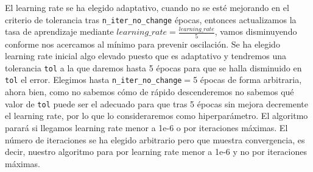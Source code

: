 \documentclass[11pt,a4paper]{article}
\theoremstyle{definition}
\begin{document}
	 El learning rate se ha elegido adaptativo, cuando no se esté mejorando en el criterio de tolerancia tras \texttt{n\_iter\_no\_change} épocas, entonces actualizamos la tasa de aprendizaje mediante $learning\_rate =\frac{learning\_rate}{5}$, vamos disminuyendo conforme nos acercamos al mínimo para prevenir oscilación. Se ha elegido learning rate inicial algo elevado puesto que es adaptativo y  tendremos una tolerancia \texttt{tol} a la que daremos hasta 5 épocas para que se halla disminuido en \texttt{tol} el error. Elegimos hasta \texttt{n\_iter\_no\_change}$=$5 épocas de forma arbitraria, ahora bien, como no sabemos cómo de rápido descenderemos no sabemos qué valor de \texttt{tol} puede ser el adecuado para que tras 5 épocas sin mejora decremente el learning rate, por lo que lo consideraremos como hiperparámetro. El algoritmo parará si llegamos learning rate menor a 1e-6 o por iteraciones máximas. El número de iteraciones se ha elegido arbitrario pero que muestra convergencia, es decir, nuestro algoritmo para por learning rate menor a 1e-6 y no por iteraciones máximas.
	 
\end{document}
